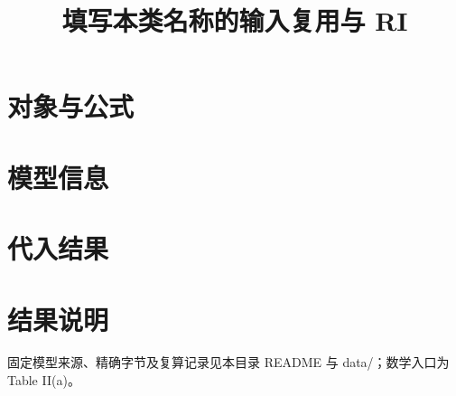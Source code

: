 
\renewcommand{\WorkloadName}{填写本类名称}
\title{\bfseries\WorkloadName 的输入复用与 RI}

\maketitle
\section{对象与公式}
\section{模型信息}
\begin{center}\small\end{center}
\section{代入结果}
\begin{center}\small\end{center}
\DisplayNote
\section{结果说明}
\par\smallskip\noindent\small
固定模型来源、精确字节及复算记录见本目录 README 与 data/；数学入口为 Table II(a)。

